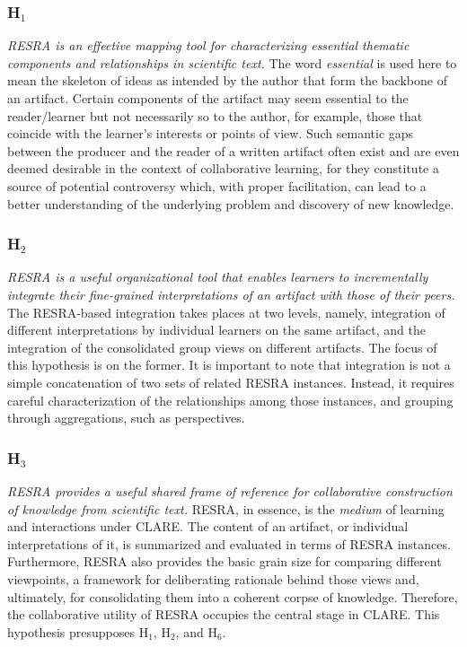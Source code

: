 \subsubsection{H\(_1\)}
\label{sec:RESRA1}

{\it RESRA is an effective mapping tool for characterizing essential
thematic components and relationships in scientific text.} The word {\it
essential\/} is used here to mean the skeleton of ideas as intended by the
author that form the backbone of an artifact. Certain components of the
artifact may seem essential to the reader/learner but not necessarily so to
the author, for example, those that coincide with the learner's interests
or points of view. Such semantic gaps between the producer and the reader
of a written artifact often exist and are even deemed desirable in the
context of collaborative learning, for they constitute a source of
potential controversy which, with proper facilitation, can lead to a better
understanding of the underlying problem and discovery of new knowledge.


\subsubsection{H\(_2\)}
\label{sec:RESRA2}

{\it RESRA is a useful organizational tool that enables learners to
incrementally integrate their fine-grained interpretations of an artifact
with those of their peers.} The RESRA-based integration takes places at two
levels, namely, integration of different interpretations by individual
learners on the same artifact, and the integration of the consolidated
group views on different artifacts. The focus of this hypothesis is on the
former. It is important to note that integration is not a simple
concatenation of two sets of related RESRA instances. Instead, it requires
careful characterization of the relationships among those instances, and
grouping through aggregations, such as perspectives.


\subsubsection{H\(_3\)}
\label{sec:RESRA3}

{\it RESRA provides a useful shared {\it frame of reference\/} for
collaborative construction of knowledge from scientific text.} RESRA, in
essence, is the {\it medium\/} of learning and interactions under
CLARE. The content of an artifact, or individual interpretations of it, is
summarized and evaluated in terms of RESRA instances. Furthermore, RESRA
also provides the basic grain size for comparing different viewpoints, a
framework for deliberating rationale behind those views and, ultimately,
for consolidating them into a coherent corpse of knowledge.  Therefore, the
collaborative utility of RESRA occupies the central stage in CLARE. This
hypothesis presupposes {\sf H\(_1\)}, {\sf H\(_2\)}, and {\sf H\(_6\)}.


